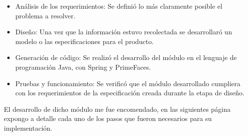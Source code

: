 \documentclass[../reportesINE.tex]{subfiles}
\begin{document}
\begin{itemize}
 \item Análisis de los requerimientos: Se definió lo más claramente posible el problema a resolver. \\
 \item Diseño: Una vez que la información estuvo recolectada se desarrollaró un modelo o las especificaciones para el producto. \\
 \item Generación de código: Se realizó el desarrollo del módulo en el lenguaje de programación Java, con Spring y PrimeFaces. \\
 \item Pruebas y funcionamiento: Se verificó que el módulo desarrollado cumpliera con los requerimientos de la especificación creada durante la etapa de diseño.
\end{itemize}


El desarrollo de dicho módulo me fue encomendado, en las siguientes página expongo a detalle cada uno de los pasos que fueron necesarios para su implementación. 
\end{document}
